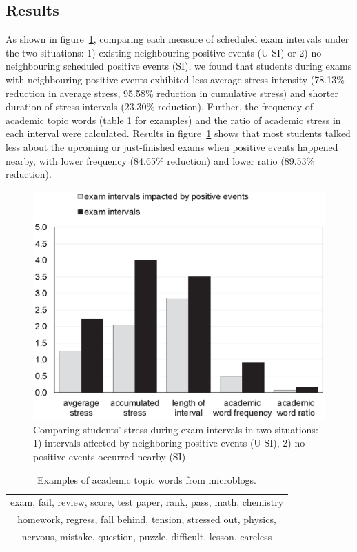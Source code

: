 \subsection{Results}
As shown in figure~\ref{fig:frequency},
comparing each measure of scheduled exam intervals under the two situations:
1) existing neighbouring positive events (U-SI) or 2) no neighbouring scheduled positive events (SI),
we found that students during exams with neighbouring positive events exhibited less average stress intensity
(78.13\% reduction in average stress, 95.58\%  reduction in cumulative stress)
and shorter duration of stress intervals (23.30\% reduction).
Further, the frequency of academic topic words (table \ref{tab:studyWords} for examples)
and the ratio of academic stress in each interval were calculated.
Results in figure~\ref{fig:frequency} shows that most students talked less about the upcoming or just-finished exams when positive events happened nearby,
with lower frequency (84.65\% reduction) and lower ratio (89.53\% reduction).

\begin{figure}[h]
\centering
\includegraphics[width=0.8\linewidth]{figs/obnew-color.eps}
\caption{\small{Comparing students' stress during exam intervals in two situations:
1) intervals affected by neighboring positive events (U-SI), 2) no positive events occurred nearby (SI)}}
\label{fig:frequency}
\end{figure}


\begin{table}[h]
\centering
\caption{\small{Examples of academic topic words from microblogs.}}
\label{tab:studyWords}
\small{
\begin{tabular}{c}
\toprule
exam, fail, review, score, test paper, rank, pass, math, chemistry\\
homework, regress, fall behind, tension, stressed out, physics,\\
nervous, mistake, question, puzzle, difficult, lesson, careless\\
\bottomrule
\end{tabular}
}
\end{table}

